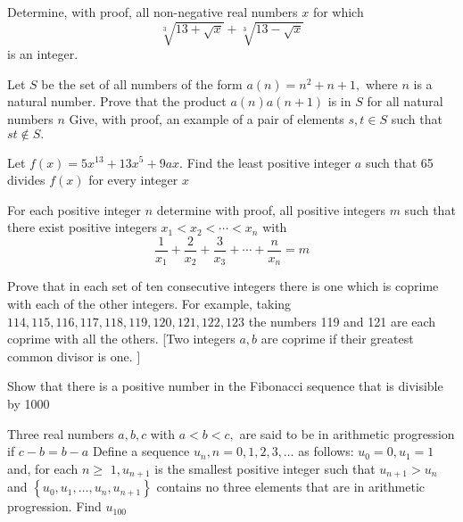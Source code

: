 \documentclass{pset}
\begin{document}
\begin{problems}
\begin{problem}[IrMO 2001 Q9]
    Determine, with proof, all non-negative real numbers \(x\) for which
    $$
    \sqrt[3]{13+\sqrt{x}}+\sqrt[3]{13-\sqrt{x}}
    $$
    is an integer.
\end{problem}

\begin{problem}[IrMO 2000 Q1]
    Let \(S\) be the set of all numbers of the form \(a(n)=n^{2}+n+1,\) where \(n\) is a natural number. Prove that the product \(a(n) a(n+1)\) is in \(S\) for all natural numbers \(n\) Give, with proof, an example of a pair of elements \(s, t \in S\) such that \(s t \notin S .\)
\end{problem}

\begin{problem}[IrMO 2000 Q3]
    Let \(f(x)=5 x^{13}+13 x^{5}+9 a x .\) Find the least positive integer \(a\) such that 65 divides
    \(f(x)\) for every integer \(x\) 
\end{problem}

\begin{problem}[IrMO 2000 Q8]
    For each positive integer \(n\) determine with proof, all positive integers \(m\) such that there exist positive integers \(x_{1}<x_{2}<\cdots<x_{n}\) with
    $$
    \frac{1}{x_{1}}+\frac{2}{x_{2}}+\frac{3}{x_{3}}+\cdots+\frac{n}{x_{n}}=m
    $$
\end{problem}

\begin{problem}[IrMO 2000 Q9]
    Prove that in each set of ten consecutive integers there is one which is coprime with each of the other integers. For example, taking \(114,115,116,117,118,119,120,121,122,123\) the numbers 119 and 121 are each coprime with all the others. [Two integers \(a, b\) are coprime if their greatest common divisor is one. \(]\)
\end{problem}

\begin{problem}[IrMO 1999 Q2]
    Show that there is a positive number in the Fibonacci sequence that is divisible by 1000
\end{problem}

\begin{problem}[IrMO 1999 Q5]
    Three real numbers \(a, b, c\) with \(a<b<c,\) are said to be in arithmetic progression
    if \(c-b=b-a\) Define a sequence \(u_{n}, n=0,1,2,3, \ldots\) as follows: \(u_{0}=0, u_{1}=1\) and, for each \(n \geq\)
    \(1, u_{n+1}\) is the smallest positive integer such that \(u_{n+1}>u_{n}\) and \(\left\{u_{0}, u_{1}, \ldots, u_{n}, u_{n+1}\right\}\) contains no three elements that are in arithmetic progression. Find \(u_{100}\)
\end{problem}


\end{problems}
\end{document}
